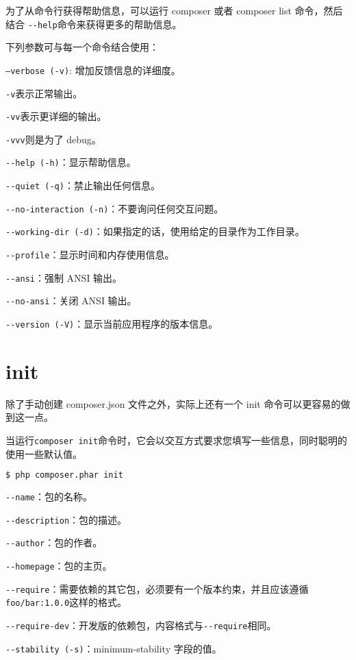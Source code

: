 为了从命令行获得帮助信息，可以运行 composer 或者 composer list 命令，然后结合 \texttt{-\/-help}命令来获得更多的帮助信息。

下列参数可与每一个命令结合使用：

\begin{compactenum}
\item \texttt{--verbose (-v)}: 增加反馈信息的详细度。

\begin{compactitem}
\item \texttt{-v}表示正常输出。
\item \texttt{-vv}表示更详细的输出。
\item \texttt{-vvv}则是为了 debug。
\end{compactitem}

\item \texttt{-\/-help (-h)}：显示帮助信息。
\item \texttt{-\/-quiet (-q)}：禁止输出任何信息。
\item \texttt{-\/-no-interaction (-n)}：不要询问任何交互问题。
\item \texttt{-\/-working-dir (-d)}：如果指定的话，使用给定的目录作为工作目录。
\item \texttt{-\/-profile}：显示时间和内存使用信息。
\item \texttt{-\/-ansi}：强制 ANSI 输出。
\item \texttt{-\/-no-ansi}：关闭 ANSI 输出。
\item \texttt{-\/-version (-V)}：显示当前应用程序的版本信息。
\end{compactenum}






\section{init}

除了手动创建 composer.json 文件之外，实际上还有一个 init 命令可以更容易的做到这一点。

当运行\texttt{composer init}命令时，它会以交互方式要求您填写一些信息，同时聪明的使用一些默认值。

\begin{lstlisting}[language=bash]
$ php composer.phar init
\end{lstlisting}

\begin{compactitem}
\item \texttt{-\/-name}：包的名称。
\item \texttt{-\/-description}：包的描述。
\item \texttt{-\/-author}：包的作者。
\item \texttt{-\/-homepage}：包的主页。
\item \texttt{-\/-require}：需要依赖的其它包，必须要有一个版本约束，并且应该遵循\texttt{foo/bar:1.0.0}这样的格式。
\item \texttt{-\/-require-dev}：开发版的依赖包，内容格式与\texttt{-\/-require}相同。
\item \texttt{-\/-stability (-s)}：minimum-stability 字段的值。
\end{compactitem}


